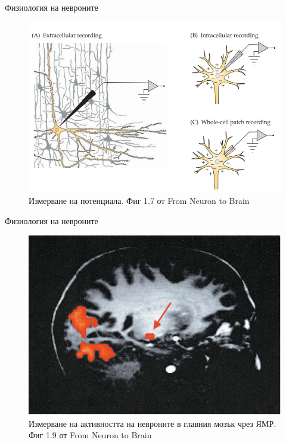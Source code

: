 \begin{frame}[t]{Физиология на невроните}
  \begin{figure}[htbp!]
    \centering
    \includegraphics[width=\textwidth,height=0.7\textheight,keepaspectratio]{electrical-recording.PNG}
    \caption{Измерване на потенциала. Фиг 1.7 от From Neuron to Brain}
  \end{figure}
\end{frame}

\begin{frame}[t]{Физиология на невроните}
  \begin{figure}[htbp!]
    \centering
    \includegraphics[width=\textwidth,height=0.7\textheight,keepaspectratio]{mri-recording.PNG}
    \caption{Измерване на активността на невроните в главния мозък чрез ЯМР. Фиг 1.9 от From Neuron to Brain}
  \end{figure}
\end{frame}

